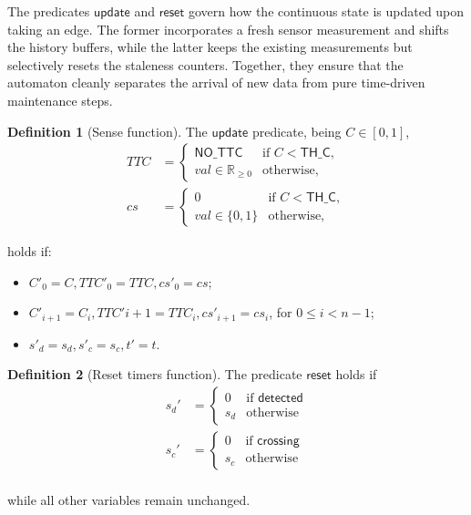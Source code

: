 \documentclass[journal]{IEEEtran}
\theoremstyle{definition}
\newtheorem{definition}{Definition}
\theoremstyle{property}
\newcommand{\thr}[1]{\mathsf{#1}}
\newcommand{\detd}{\mathsf{detected}}
\newcommand{\cross}{\mathsf{crossing}}
\newcommand{\sns}{\mathsf{update}}
\newcommand{\rst}{\mathsf{reset}}
\begin{document}
The predicates $\sns$ and $\rst$ govern how the continuous state is updated upon taking an edge. The former incorporates a fresh sensor measurement and shifts the history buffers, while the latter keeps the existing measurements but selectively resets the staleness counters. Together, they ensure that the automaton cleanly separates the arrival of new data from pure time-driven maintenance steps.


\begin{definition}[Sense function]\label{def:app_sense}
The $\sns$ predicate, being $C \in [0,1]$, 
\[
\begin{aligned}
TTC &=
  \begin{cases}
    \thr{NO\_TTC} & \text{if } C < \thr{TH\_C},\\
    val \in \mathbb{R}_{\geq0} & \text{otherwise,}
  \end{cases}\\
cs &=
  \begin{cases}
    0 & \text{if } C < \thr{TH\_C},\\
    val \in \{0,1\} & \text{otherwise,}
  \end{cases}
\end{aligned}
\]  
\end{definition}
holds if:
\begin{itemize}
    \item $C'_0 = C, TTC'_0 = TTC, cs'_0 = cs$;
    \item $C'_{i+1} = C_i, TTC'{i+1} = TTC_i, cs'_{i+1} = cs_i$, for $0 \leq i < n - 1$;
    \item $s'_d = s_d, s'_c = s_c, t' = t$. 
\end{itemize} 

\begin{definition}[Reset timers function]\label{def:app_reset_func}
The predicate $\rst$ holds if
\[
    \begin{aligned}
    s_d' &=     
    \begin{cases}
        0 & \text{if } \detd \\
        s_d & \text{otherwise}
    \end{cases}\\
    s_c' &=     
    \begin{cases}
        0 & \text{if } \cross \\
        s_c & \text{otherwise}
    \end{cases}\\
    \end{aligned}
\]
\end{definition}
while all other variables remain unchanged.
\end{document}
